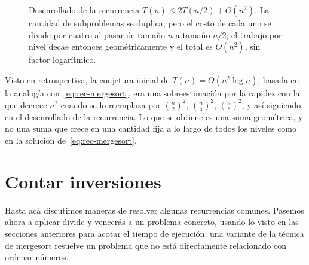 \documentclass[12pt, spanish, oneside, openany]{book}
\theoremstyle{uprightplain}
\theoremstyle{definition}
\theoremstyle{remark}
\theoremstyle{definition}
\begin{document}
\begin{figure}[H]
\centering
{}
\caption{Desenrollado de la recurrencia $T(n)\le 2T(n/2)+O(n^2)$. La cantidad de
subproblemas se duplica, pero el costo de cada uno se divide por cuatro al
pasar de tamaño $n$ a tamaño $n/2$; el trabajo por nivel decae entonces
geométricamente y el total es $O(n^2)$, sin factor logarítmico.}
\label{fig:desenrollo-cuadratica}
\end{figure}

Visto en retrospectiva, la conjetura inicial de $T(n)=O(n^2\log n)$, basada en la analogía con~\eqref{eq:rec-mergesort}, era una sobreestimación por la rapidez con la que decrece $n^2$ cuando se lo reemplaza por $(\tfrac{n}{2})^2$, $(\tfrac{n}{4})^2$, $(\tfrac{n}{8})^2$, y así siguiendo, en el desenrollado de la recurrencia. Lo que se obtiene es una suma geométrica, y no una suma que crece en una cantidad fija a lo largo de todos los niveles como en la solución de~\eqref{eq:rec-mergesort}.

\section{Contar inversiones}
\label{sec:inversiones}

Hasta acá discutimos maneras de resolver algunas recurrencias comunes. Pasemos ahora a aplicar divide y vencerás a un problema concreto, usando lo visto en las secciones anteriores para acotar el tiempo de ejecución: una variante de la técnica de mergesort resuelve un problema que no está directamente relacionado con ordenar números.
\end{document}
